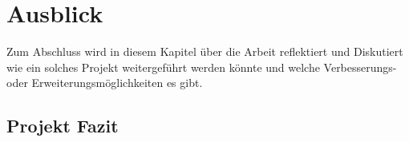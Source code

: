 \chapter{Ausblick}
\label{ch:Ausblick}

Zum Abschluss wird in diesem Kapitel über die Arbeit reflektiert und Diskutiert wie ein solches Projekt weitergeführt werden könnte und welche Verbesserungs- oder Erweiterungsmöglichkeiten es gibt.

\section{Projekt Fazit}